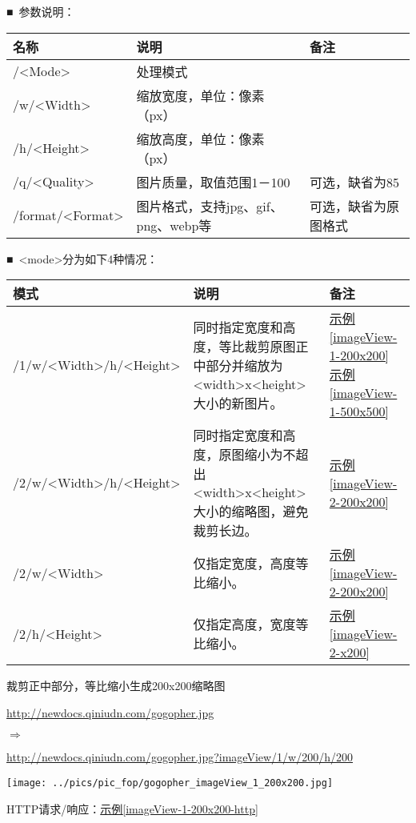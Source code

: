 \documentclass[11pt, oneside]{book}
\newcommand{\qsym}[1]{
\footnotesize
\noindent
#1\par
\normalsize
}
\newcommand{\qpara}[1]{
\vspace{0.3em}
\noindent
#1\par
\vspace{0.3em}
}
\newcommand{\qsamplelink}[1]{
\vspace{0.2em}
\noindent
#1\par
\vspace{0.1em}
}
\newcommand{\qurl}[1]{\footnotesize\url{#1}\normalsize}
\newcommand{\qtable}[1]{\footnotesize\vspace{0.5em}#1\vspace{0.5em}\normalsize}
\newcommand{\qsample}[1]{\hyperref[#1]{示例\ref*{#1}}}
\begin{document}
\qpara{■\ 参数说明：}
\qtable{
\def\arraystretch{2}
\begin{tabular}{|l|l|p{10.35em}|}
\hline
名称 & 说明 & 备注\\
\hline
/\textless Mode\textgreater & 处理模式 & \\
\hline
/w/\textless Width\textgreater & 缩放宽度，单位：像素（px） & \\
\hline
/h/\textless Height\textgreater & 缩放高度，单位：像素（px） & \\
\hline
/q/\textless Quality\textgreater & 图片质量，取值范围1－100 & 可选，缺省为85 \\
\hline
/format/\textless Format\textgreater & 图片格式，支持jpg、gif、png、webp等 & 可选，缺省为原图格式 \\
\hline
\end{tabular}
}

\qpara{■\ \textless mode\textgreater 分为如下4种情况：}
\qtable{
\def\arraystretch{2}
\begin{tabular}{|l|p{20em}|p{5em}|}
\hline
模式 & 说明 & 备注 \\
\hline
/1/w/\textless Width\textgreater /h/\textless Height\textgreater & 同时指定宽度和高度，等比裁剪原图正中部分并缩放为\textless width\textgreater x\textless height\textgreater 大小的新图片。& \qsample{imageView-1-200x200} \newline \qsample{imageView-1-500x500} \\
\hline
/2/w/\textless Width\textgreater /h/\textless Height\textgreater & 同时指定宽度和高度，原图缩小为不超出\textless width\textgreater x\textless height\textgreater 大小的缩略图，避免裁剪长边。& \qsample{imageView-2-200x200} \\
\hline
/2/w/\textless Width\textgreater & 仅指定宽度，高度等比缩小。 & \qsample{imageView-2-200x200} \\
\hline
/2/h/\textless Height\textgreater & 仅指定高度，宽度等比缩小。 & \qsample{imageView-2-x200} \\
\hline
\end{tabular}
}

\clearpage

\begin{sample}
  \caption{裁剪正中部分，等比缩小生成200x200缩略图}
    \qsamplelink{\qurl{http://newdocs.qiniudn.com/gogopher.jpg}}
    \qsym{$\Rightarrow$}
    \qsamplelink{\qurl{http://newdocs.qiniudn.com/gogopher.jpg?imageView/1/w/200/h/200}}

    \begin{center}
      \texttt{[image: ../pics/pic\_fop/gogopher\_imageView\_1\_200x200.jpg]}
    \end{center}

    \qpara{HTTP请求/响应：\qsample{imageView-1-200x200-http}}
  \label{imageView-1-200x200}
\end{sample}
\end{document}
